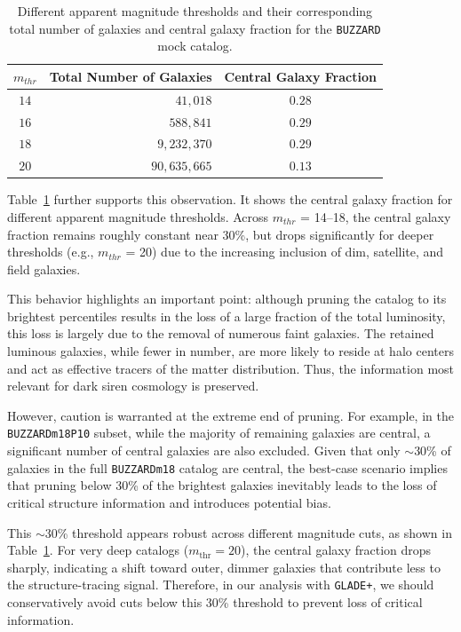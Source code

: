 \begin{table}
    \small
    \centering
    \caption[Central galaxy fraction for different $m_{thr}$ for \texttt{BUZZARD}.]{Different apparent magnitude thresholds and their corresponding total number of galaxies and central galaxy fraction for the \texttt{BUZZARD} mock catalog.}
    \label{tab:MDC_catalogs}
    \begin{tabular}{c r c}
        \hline
        \textbf{$m_{thr}$} & \textbf{Total Number of Galaxies} & \textbf{Central Galaxy Fraction} \\
        \hline
        $14$ & $41,018$ & $0.28$\\
        $16$ & $588,841$ & $0.29$ \\
        $18$ & $9,232,370$ & $0.29$ \\
        $20$ & $90,635,665$ & $0.13$ \\
        \hline
    \end{tabular}
\end{table}

Table~\ref{tab:MDC_catalogs} further supports this observation. It shows the central galaxy fraction for different apparent magnitude thresholds. Across $m_{thr}$ = 14–18, the central galaxy fraction remains roughly constant near 30\%, but drops significantly for deeper thresholds (e.g., $m_{thr}$ = 20) due to the increasing inclusion of dim, satellite, and field galaxies.

This behavior highlights an important point: although pruning the catalog to its brightest percentiles results in the loss of a large fraction of the total luminosity, this loss is largely due to the removal of numerous faint galaxies. The retained luminous galaxies, while fewer in number, are more likely to reside at halo centers and act as effective tracers of the matter distribution. Thus, the information most relevant for dark siren cosmology is preserved.

However, caution is warranted at the extreme end of pruning. For example, in the \texttt{BUZZARDm18P10} subset, while the majority of remaining galaxies are central, a significant number of central galaxies are also excluded. Given that only $\sim$30\% of galaxies in the full \texttt{BUZZARDm18} catalog are central, the best-case scenario implies that pruning below 30\% of the brightest galaxies inevitably leads to the loss of critical structure information and introduces potential bias.

This $\sim$30\% threshold appears robust across different magnitude cuts, as shown in Table~\ref{tab:MDC_catalogs}. For very deep catalogs ($m_{\mathrm{thr}} = 20$), the central galaxy fraction drops sharply, indicating a shift toward outer, dimmer galaxies that contribute less to the structure-tracing signal. Therefore, in our analysis with \texttt{GLADE+}, we should conservatively avoid cuts below this 30\% threshold to prevent loss of critical information.

